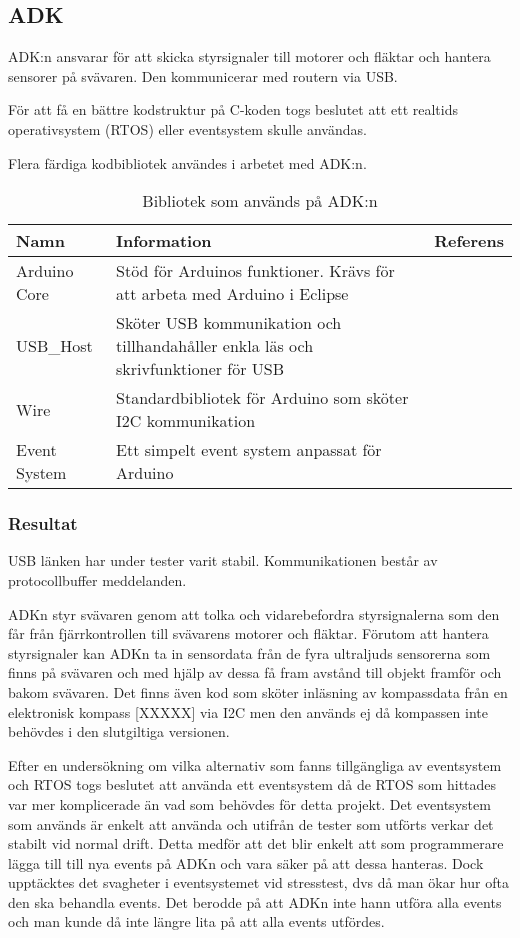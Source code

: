 \subsection{ADK}
ADK:n ansvarar för att skicka styrsignaler till motorer och fläktar och hantera sensorer på svävaren. 
Den kommunicerar med routern via USB.

För att få en bättre kodstruktur på C-koden togs beslutet att ett realtids operativsystem (RTOS) 
eller eventsystem skulle användas.

Flera färdiga kodbibliotek användes i arbetet med ADK:n. 

\begin{table}[htb]
\centering
\caption{Bibliotek som används på ADK:n}
\label{tbl:BOM}
\begin{tabular}{|l|p{}|c|}
\hline
\textbf{Namn} & \textbf{Information} & \textbf{Referens} \\
\hline
Arduino Core & Stöd för Arduinos funktioner. Krävs för att arbeta med Arduino i Eclipse &  \cite{Delta_BFB1212VH-R00}\\ 
\hline
USB\_Host & Sköter USB kommunikation och tillhandahåller enkla läs och skrivfunktioner för USB & \cite{USBHost}\\
\hline
Wire & Standardbibliotek för Arduino som sköter I2C kommunikation &  \cite{Wire}\\
\hline
Event System & Ett simpelt event system anpassat för Arduino & \cite{Eventsystem} \\
\hline
\end{tabular}	
\end{table}

\subsubsection{Resultat}
USB länken har under tester varit stabil.
Kommunikationen består av protocollbuffer meddelanden.

ADKn styr svävaren genom att tolka och vidarebefordra styrsignalerna 
som den får från fjärrkontrollen till svävarens motorer och fläktar. 
Förutom att hantera styrsignaler kan ADKn ta in sensordata från de fyra ultraljuds 
sensorerna som finns på svävaren och med hjälp av dessa få fram avstånd till objekt framför och bakom svävaren.
Det finns även kod som sköter inläsning av kompassdata från en elektronisk kompass [XXXXX] via I2C men den 
används ej då kompassen inte behövdes i den slutgiltiga versionen.

Efter en undersökning om vilka alternativ som fanns tillgängliga av eventsystem och RTOS togs beslutet 
att använda ett eventsystem då de RTOS som hittades var mer komplicerade än vad som behövdes för detta projekt.
Det eventsystem som används är enkelt att använda och utifrån de tester som utförts verkar det stabilt vid normal drift. 
Detta medför att det blir enkelt att som programmerare lägga till till nya events på ADKn och 
vara säker på att dessa hanteras. 
Dock upptäcktes det svagheter i eventsystemet vid stresstest, dvs då man ökar hur ofta den ska behandla events. 
Det berodde på att ADKn inte hann utföra alla events och man kunde då inte längre lita på att alla events utfördes.

